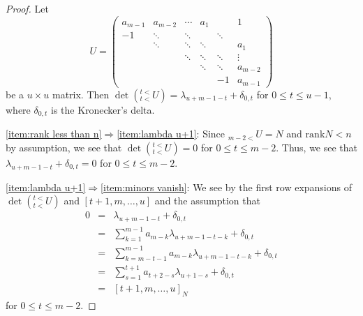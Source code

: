 \documentclass[a4paper,12pt]{article}
\newcommand{\rank}{\mathrm{rank}}
\begin{document}
\begin{proof}
Let
$$
U=\begin{pmatrix}
a_{m-1}&a_{m-2}&\cdots&a_1&&1\\
-1&\ddots&\ddots&&\ddots\\
&\ddots&\ddots&\ddots&&a_1\\
&&\ddots&\ddots&\ddots&\vdots\\
&&&\ddots&\ddots&a_{m-2}\\
&&&&-1&a_{m-1}
\end{pmatrix}
$$
be a $u\times u$ matrix.
Then $\det({}^{t<}_{t<}U)=\lambda_{u+m-1-t}+\delta_{0,t}$ for $0\leq t\leq u-1$,
where $\delta_{0,t}$ is the Kronecker's delta.

\ref{item:rank less than n}$\Longrightarrow$\ref{item:lambda u+1}:
Since ${}_{m-2<}U=N$ and $\rank N<n$ by assumption, we see that
$\det({}^{t<}_{t<}U)=0$ for $0\leq t\leq m-2$.
Thus, we see that
$\lambda_{u+m-1-t}+\delta_{0,t}=0$ for $0\leq t\leq m-2$.

\ref{item:lambda u+1}$\Longrightarrow$\ref{item:minors vanish}:
We see by the first row expansions of $\det({}_{t<}^{t<}U)$ 
and $[t+1,m,\ldots, u]$
and the assumption that
\begin{eqnarray*}
0&=&\lambda_{u+m-1-t}+\delta_{0,t}\\
&=&\sum_{k=1}^{m-1}a_{m-k}\lambda_{u+m-1-t-k}+\delta_{0,t}\\
&=&\sum_{k=m-t-1}^{m-1}a_{m-k}\lambda_{u+m-1-t-k}+\delta_{0,t}\\
&=&\sum_{s=1}^{t+1}a_{t+2-s}\lambda_{u+1-s}+\delta_{0,t}\\
&=&[t+1,m,\ldots, u]_N
\end{eqnarray*}
for $0\leq t\leq m-2$.


\iffalse

\ref{item:minors vanish}$\Longrightarrow$\ref{item:rank less than n}
follows from the fact that
the last $n-1$ rows of $N$ are linearly independent.



\ref{item:rank less than n}$\iff$\ref{item:minors vanish} follows from the fact that
the last $n-1$ rows of $N$ are linearly independent.

\ref{item:minors vanish}$\iff$\ref{item:lambda u+1}:
Since 
$[m-t,m,\ldots, u]_N=\sum_{s=1}^{m-t}a_{m-t+1-s}\lambda_{u+1-s}$
for $1\leq t\leq m-2$,
we see
by the first row expansion that
$$
[m-t,m,\ldots, u]_N=\sum_{k=t}^{m-1}a_{m-k}\lambda_{u+t-k}
=\lambda_{u+t}-\sum_{k=1}^{t-1}a_{m-k}\lambda_{u+t-k}
$$
by Lemma \ref{lem:rec rel}.
Thus, we see by induction on $t$, that
$[m-t,m,\ldots,u]_N=0$ for $1\leq t\leq m-2$ if and only if
$\lambda_{u+t}=0$ for $1\leq t\leq m-2$.
Further, since $[1,m,\ldots, u]_N=a_1\lambda_u+1$ by the first row expansion,
we see that 
$[1,m,\ldots,u]_N=0$ if and only if $a_1\lambda_u=-1$.
Since $\lambda_{u+m-1}=\sum_{k=1}^{m-1}a_{m-k}\lambda_{u+m-1-k}$,
by Lemma \ref{lem:rec rel}, we see that if $\lambda_{u+t}=0$ for $1\leq t\leq m-2$,
then $\lambda_{u+m-1}=a_1\lambda_u$.
Thus we see 
\ref{item:minors vanish}$\iff$\ref{item:lambda u+1}.
\fi



\end{proof}
\end{document}

